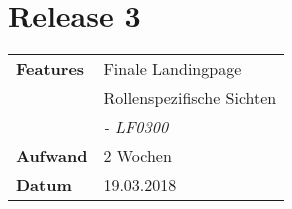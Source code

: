 
\section*{Release 3}
\label{sec:release_3}

\begin{tabular}{p{5cm} p{9cm}}
    \textbf{Features} & Finale Landingpage \\
    & Rollenspezifische Sichten \\
    & \hspace{8pt} \textit{\footnotesize - LF0300} \\
    \hline
    \textbf{Aufwand} & 2 Wochen \\
    \hline
    \textbf{Datum} & 19.03.2018 \\
\end{tabular}
